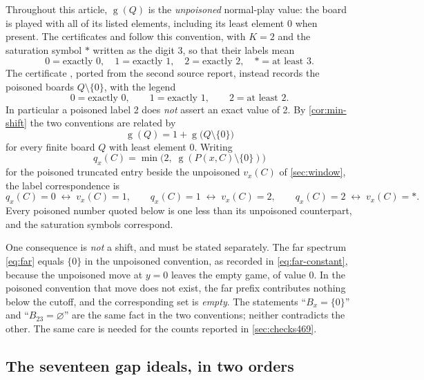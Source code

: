 \documentclass[11pt,letterpaper]{article}
\numberwithin{equation}{section}
\theoremstyle{definition}
\theoremstyle{remark}
\newcommand{\sg}{\operatorname{g}}
\newcommand{\sat}{\ast}
\begin{document}
Throughout this article, $\sg(Q)$ is the \emph{unpoisoned} normal-play
value: the board is played with all of its listed elements, including its
least element 0 when present. The certificates
 and  follow
this convention, with $K=2$ and the saturation symbol $\sat$ written as
the digit 3, so that their labels mean
\[
 0=\text{exactly }0,\quad 1=\text{exactly }1,\quad
 2=\text{exactly }2,\quad \sat=\text{at least }3 .
\]
The certificate , ported from the
second source report, instead records the poisoned boards
$Q\setminus\{0\}$, with the legend
\[
 \boxed{\quad 0=\text{exactly }0,\qquad
 1=\text{exactly }1,\qquad 2=\text{at least }2.\quad}
\]
In particular a poisoned label 2 does \emph{not} assert an exact value
of 2. By \cref{cor:min-shift} the two conventions are related by
\begin{equation}\label{eq:dictionary}
 \sg(Q)=1+\sg\bigl(Q\setminus\{0\}\bigr)
\end{equation}
for every finite board $Q$ with least element 0. Writing
\[
 q_x(C)=\min\bigl(2,\;\sg(P(x,C)\setminus\{0\})\bigr)
\]
for the poisoned truncated entry beside the unpoisoned $v_x(C)$ of
\cref{sec:window}, the label correspondence is
\begin{equation}\label{eq:label-dictionary}
 q_x(C)=0\;\leftrightarrow\;v_x(C)=1,\qquad
 q_x(C)=1\;\leftrightarrow\;v_x(C)=2,\qquad
 q_x(C)=2\;\leftrightarrow\;v_x(C)=\sat .
\end{equation}
Every poisoned number quoted below is one less than its unpoisoned
counterpart, and the saturation symbols correspond.

One consequence is \emph{not} a shift, and must be stated separately. The
far spectrum \cref{eq:far} equals $\{0\}$ in the unpoisoned convention,
as recorded in \cref{eq:far-constant}, because the unpoisoned move at
$y=0$ leaves the empty game, of value 0. In the poisoned convention that
move does not exist, the far prefix contributes nothing below the cutoff,
and the corresponding set is \emph{empty}. The statements ``$B_x=\{0\}$''
and ``$B_{23}=\varnothing$'' are the same fact in the two conventions;
neither contradicts the other. The same care is needed for the counts
reported in \cref{sec:checks469}.

\subsection{The seventeen gap ideals, in two orders}
\label{sec:ideals469}
\end{document}
